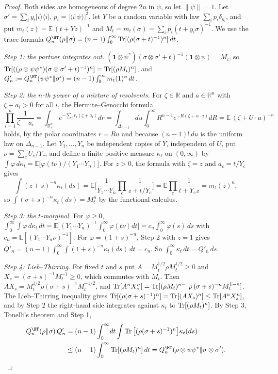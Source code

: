 \begin{proof}
Both sides are homogeneous of degree $2n$ in $\psi$, so let $\|\psi\|=1$. Let $\sigma'=\sum_iy_i|i\rangle\langle i|$, $p_i=|\langle i|\psi\rangle|^2$, let $Y$ be a random variable with law $\sum_ip_i\delta_{y_i}$, and put $m_t(z)=\mathbb E\,(t+Yz)^{-1}$ and $M_t=m_t(\sigma)=\sum_ip_i(t+y_i\sigma)^{-1}$. We use the trace formula $Q^\HT_n(\rho\|\sigma)=(n-1)\int_0^\infty\Tr[(\rho(\sigma+t)^{-1})^n]\,dt$.

\emph{Step 1: the partner integrates out.} $(\mathbf 1\otimes\psi^*)(\sigma\otimes\sigma'+t)^{-1}(\mathbf 1\otimes\psi)=M_t$, so $\operatorname{Tr}[((\rho\otimes\psi\psi^*)(\sigma\otimes\sigma'+t)^{-1})^n]=\operatorname{Tr}[(\rho M_t)^n]$, and $Q'_n:=Q^\HT_n(\psi\psi^*\|\sigma')=(n-1)\int_0^\infty m_t(1)^n\,dt$.

\emph{Step 2: the $n$-th power of a mixture of resolvents.} For $\zeta\in\mathbb R$ and $a\in\mathbb R^n$ with $\zeta+a_i>0$ for all $i$, the Hermite--Genocchi formula
\[
\prod_{i=1}^n\frac1{\zeta+a_i}=\int_{\mathbb R_+^n}e^{-\sum_ir_i(\zeta+a_i)}dr=\int_{\Delta_{n-1}}\!\!du\int_0^\infty R^{n-1}e^{-R(\zeta+u\cdot a)}dR=\mathbb E\,(\zeta+U\cdot a)^{-n}
\]
holds, by the polar coordinates $r=Ru$ and because $(n-1)!\,du$ is the uniform law on $\Delta_{n-1}$. Let $Y_1,\dots,Y_n$ be independent copies of $Y$, independent of $U$, put $\nu=\sum_cU_c/Y_c$, and define a finite positive measure $\kappa_t$ on $(0,\infty)$ by $\int\varphi\,d\kappa_t=\mathbb E\big[\varphi(t\nu)/(Y_1\cdots Y_n)\big]$. For $z>0$, the formula with $\zeta=z$ and $a_c=t/Y_c$ gives
\[
\int(z+s)^{-n}\kappa_t(ds)=\mathbb E\Big[\frac1{Y_1\cdots Y_n}\prod_c\frac1{z+t/Y_c}\Big]=\mathbb E\prod_c\frac1{t+Y_cz}=m_t(z)^n,
\]
so $\int(\sigma+s)^{-n}\kappa_t(ds)=M_t^n$ by the functional calculus.

\emph{Step 3: the $t$-marginal.} For $\varphi\ge0$, $\int_0^\infty\!\int\varphi\,d\kappa_t\,dt=\mathbb E\big[(Y_1\cdots Y_n)^{-1}\int_0^\infty\varphi(t\nu)dt\big]=c_n\int_0^\infty\varphi(s)\,ds$ with $c_n=\mathbb E[(Y_1\cdots Y_n\nu)^{-1}]$. For $\varphi=(1+s)^{-n}$, Step 2 with $z=1$ gives $Q'_n=(n-1)\int_0^\infty\!\int(1+s)^{-n}\kappa_t(ds)\,dt=c_n$. So $\int_0^\infty\kappa_t\,dt=Q'_n\,ds$.

\emph{Step 4: Lieb--Thirring.} For fixed $t$ and $s$ put $A=M_t^{1/2}\rho M_t^{1/2}\ge0$ and $X_s=(\sigma+s)^{-1}M_t^{-1}\ge0$, which commutes with $M_t$. Then $AX_s=M_t^{1/2}\rho(\sigma+s)^{-1}M_t^{-1/2}$, and $\operatorname{Tr}[A^nX_s^n]=\operatorname{Tr}[(\rho M_t)^{n-1}\rho\,(\sigma+s)^{-n}M_t^{1-n}]$. The Lieb--Thirring inequality gives $\operatorname{Tr}[(\rho(\sigma+s)^{-1})^n]=\operatorname{Tr}[(AX_s)^n]\le\operatorname{Tr}[A^nX_s^n]$, and by Step 2 the right-hand side integrates against $\kappa_t$ to $\operatorname{Tr}[(\rho M_t)^n]$. By Step 3, Tonelli's theorem and Step 1,
\[
\begin{aligned}
Q^\HT_n(\rho\|\sigma)\,Q'_n&=(n-1)\int_0^\infty\!dt\int\Tr\big[(\rho(\sigma+s)^{-1})^n\big]\kappa_t(ds)\\
&\le(n-1)\int_0^\infty\Tr[(\rho M_t)^n]\,dt=Q^\HT_n(\rho\otimes\psi\psi^*\|\sigma\otimes\sigma').
\end{aligned}
\]


\end{proof}
